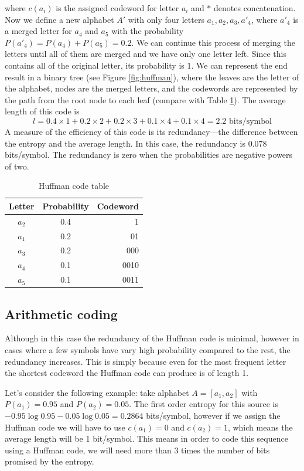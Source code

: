 \documentclass{diploma_style}
\begin{document}
where $c(a_i)$ is the assigned codeword for letter $a_i$ and $*$ denotes concatenation. Now we define a new alphabet $A'$ with only four letters $a_1, a_2, a_3, a'_4$, where $a'_4$ is a merged letter for $a_4$ and $a_5$ with the probability $P(a'_4) = P(a_4) + P(a_5) = 0.2$. We can continue this process of merging the letters until all of them are merged and we have only one letter left. Since this contains all of the original letter, its probability is 1. We can represent the end result in a binary tree (see Figure \ref{fig:huffman}), where the leaves are the letter of the alphabet, nodes are the merged letters, and the codewords are represented by the path from the root node to each leaf (compare with Table \ref{tab:huffman2}). The average length of this code is
\begin{equation}
l = 0.4\times 1 + 0.2 \times 2 + 0.2 \times 3 + 0.1 \times 4 + 0.1 \times 4 = 2.2 \text{ bits/symbol}
\end{equation}
A measure of the efficiency of this code is its redundancy—the difference between the entropy
and the average length. In this case, the redundancy is 0.078 bits/symbol. The redundancy is
zero when the probabilities are negative powers of two.

\begin{table}
\caption{Huffman code table}
\centering
\begin{tabular}{ccr}
\toprule
Letter & Probability & Codeword \\
\midrule
$a_2$ & 0.4 & 1 \\
$a_1$ & 0.2 & 01 \\
$a_3$ & 0.2 & 000 \\
$a_4$ & 0.1 & 0010 \\
$a_5$ & 0.1 & 0011 \\
\bottomrule
\end{tabular}
\label{tab:huffman2}
\end{table}

\subsection{Arithmetic coding}
Although in this case the redundancy of the Huffman code is minimal, however in cases where a few symbols have vary high probability compared to the rest, the redundancy increases. This is simply because even for the most frequent letter the shortest codeword the Huffman code can produce is of length 1.

Let's consider the following example: take alphabet $A=[a_1, a_2]$ with $P(a_1) = 0.95$ and $P(a_2) = 0.05$. The first order entropy for this source is $-0.95 \log 0.95 - 0.05 \log 0.05 = 0.2864$ bits/symbol, however if we assign the Huffman code we will have to use $c(a_1)=0$ and $c(a_2)=1$, which means the average length will be 1 bit/symbol. This means in order to code this sequence using a Huffman code, we will need more than 3 times the number of bits promised by the entropy.
\end{document}
